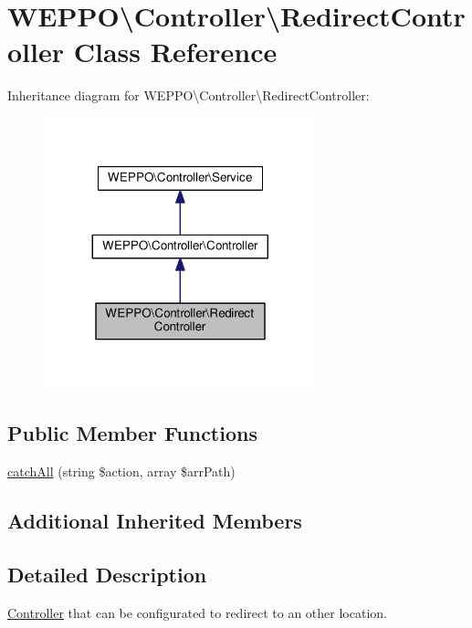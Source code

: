 \hypertarget{classWEPPO_1_1Controller_1_1RedirectController}{}\section{W\+E\+P\+PO\textbackslash{}Controller\textbackslash{}Redirect\+Controller Class Reference}
\label{classWEPPO_1_1Controller_1_1RedirectController}


Inheritance diagram for W\+E\+P\+PO\textbackslash{}Controller\textbackslash{}Redirect\+Controller\+:\nopagebreak
\begin{figure}[H]
\begin{center}
\leavevmode
\includegraphics[width=224pt]{classWEPPO_1_1Controller_1_1RedirectController__inherit__graph}
\end{center}
\end{figure}
\subsection*{Public Member Functions}
\begin{DoxyCompactItemize}
\item 
\hyperlink{classWEPPO_1_1Controller_1_1RedirectController_a0ff0f1f129efd7e207ef0eefc332d9ea}{catch\+All} (string \$action, array \$arr\+Path)
\end{DoxyCompactItemize}
\subsection*{Additional Inherited Members}


\subsection{Detailed Description}
\hyperlink{classWEPPO_1_1Controller_1_1Controller}{Controller} that can be configurated to redirect to an other location.

